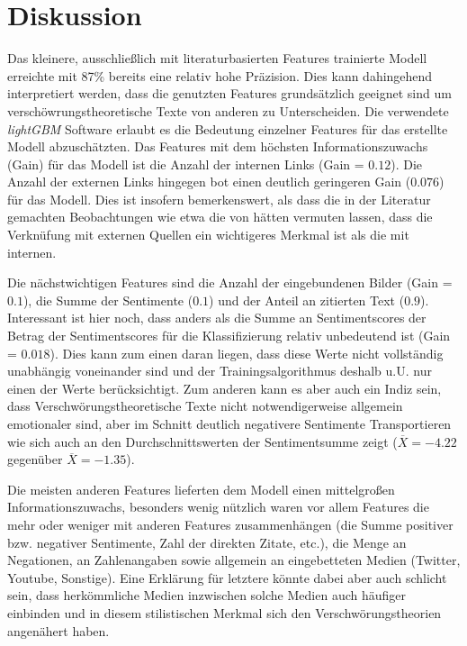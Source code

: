 \section{Diskussion}

Das kleinere, ausschließlich mit literaturbasierten Features trainierte Modell erreichte mit 87\% bereits eine relativ hohe Präzision.
Dies kann dahingehend interpretiert werden, dass die genutzten Features grundsätzlich geeignet sind um verschöwrungstheoretische Texte von anderen zu Unterscheiden.
Die verwendete \textit{lightGBM} Software erlaubt es die Bedeutung einzelner Features für das erstellte Modell abzuschätzten.
Das Features mit dem höchsten Informationszuwachs (Gain) für das Modell ist die Anzahl der internen Links (Gain = $0.12$).
Die Anzahl der externen Links hingegen bot einen deutlich geringeren Gain ($0.076$) für das Modell.
Dies ist insofern bemerkenswert, als dass die in der Literatur gemachten Beobachtungen wie etwa die von \textcite[10]{soukup_2008} hätten vermuten lassen, dass die Verknüfung mit externen Quellen ein wichtigeres Merkmal ist als die mit internen.

Die nächstwichtigen Features sind die Anzahl der eingebundenen Bilder (Gain = $0.1$), die Summe der Sentimente ($0.1$) und der Anteil an zitierten Text ($0.9$).
Interessant ist hier noch, dass anders als die Summe an Sentimentscores der Betrag der Sentimentscores für die Klassifizierung relativ unbedeutend ist (Gain = $0.018$).
Dies kann zum einen daran liegen, dass diese Werte nicht vollständig unabhängig voneinander sind und der Trainingsalgorithmus deshalb u.U. nur einen der Werte berücksichtigt.
Zum anderen kann es aber auch ein Indiz sein, dass Verschwörungstheoretische Texte nicht notwendigerweise allgemein emotionaler sind, aber im Schnitt deutlich negativere Sentimente Transportieren wie sich auch an den Durchschnittswerten der Sentimentsumme zeigt ($\overline{X} = -4.22$ gegenüber $\overline{X} = -1.35$).

Die meisten anderen Features lieferten dem Modell einen mittelgroßen Informationszuwachs, besonders wenig nützlich waren vor allem Features die mehr oder weniger mit anderen Features zusammenhängen (die Summe positiver bzw. negativer Sentimente, Zahl der direkten Zitate, etc.), die Menge an Negationen, an Zahlenangaben sowie allgemein an eingebetteten Medien (Twitter, Youtube, Sonstige).
Eine Erklärung für letztere könnte dabei aber auch schlicht sein, dass herkömmliche Medien inzwischen solche Medien auch häufiger einbinden und in diesem stilistischen Merkmal sich den Verschwörungstheorien angenähert haben.

